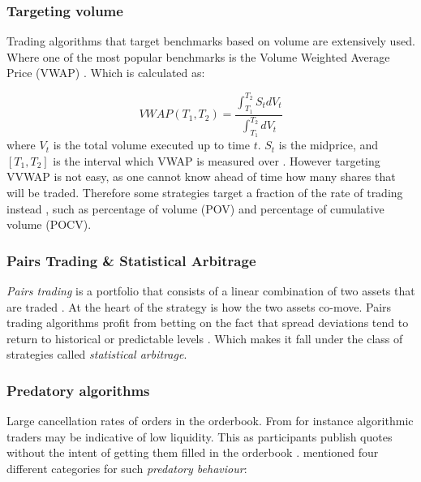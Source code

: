 \documentclass{kththesis}
\theoremstyle{definition}
\begin{document}
\subsubsection*{Targeting volume}
Trading algorithms that target benchmarks based on volume are extensively used. Where one of the most popular benchmarks is the Volume Weighted Average Price (VWAP) \parencite{cartea2015algorithmic}. Which is calculated as:

\begin{equation}
    \label{eq:at1}
    VWAP(T_1, T_2) = \frac{\int_{T_1}^{T_2}{S_t dV_t}}{\int_{T_1}^{T_2}{dV_t}}
\end{equation}
where $V_t$ is the total volume executed up to time $t$. $S_t$ is the midprice, and $[T_1, T_2]$ is the interval which VWAP is measured over \parencite{cartea2015algorithmic}. However targeting VVWAP is not easy, as one cannot know ahead of time how many shares that will be traded. Therefore some strategies target a fraction of the rate of trading instead \parencite{cartea2015algorithmic}, such as percentage of volume (POV) and percentage of cumulative volume (POCV).


\subsubsection*{Pairs Trading \& Statistical Arbitrage}
\textit{Pairs trading} is a portfolio that consists of a linear combination of two assets that are traded \parencite{cartea2015algorithmic}. At the heart of the strategy is how the two assets co-move. Pairs trading algorithms profit from betting on the fact that spread deviations tend to return to historical or predictable levels \parencite{cartea2015algorithmic}. Which makes it fall under the class of strategies called \textit{statistical arbitrage}.

\subsubsection*{Predatory algorithms}
Large cancellation rates of orders in the orderbook. From for instance algorithmic traders may be indicative of low liquidity. This as participants publish quotes without the intent of getting them filled in the orderbook \parencite{de2018advances}. \textcite{de2018advances} mentioned four different categories for such \textit{predatory behaviour}:
\end{document}
